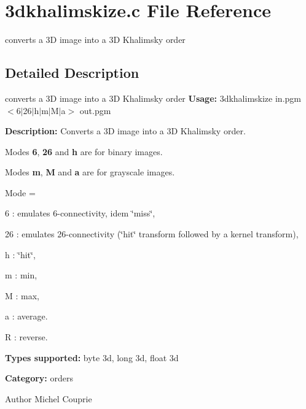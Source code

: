 \section{3dkhalimskize.c File Reference}
\label{3dkhalimskize_8c}


converts a 3D image into a 3D Khalimsky order  




\subsection{Detailed Description}
converts a 3D image into a 3D Khalimsky order {\bfseries Usage:} 3dkhalimskize in.pgm $<$6$|$26$|$h$|$m$|$M$|$a$>$ out.pgm

{\bfseries Description:} Converts a 3D image into a 3D Khalimsky order.

Modes {\bfseries 6}, {\bfseries 26} and {\bfseries h} are for binary images.

Modes {\bfseries m}, {\bfseries M} and {\bfseries a} are for grayscale images.

Mode = \begin{DoxyItemize}
\item 6 : emulates 6-\/connectivity, idem \char`\"{}miss\char`\"{}, \item 26 : emulates 26-\/connectivity (\char`\"{}hit\char`\"{} transform followed by a kernel transform), \item h : \char`\"{}hit\char`\"{}, \item m : min, \item M : max, \item a : average. \item R : reverse.\end{DoxyItemize}
{\bfseries Types supported:} byte 3d, long 3d, float 3d

{\bfseries Category:} orders

\begin{DoxyAuthor}{Author}
Michel Couprie 
\end{DoxyAuthor}
